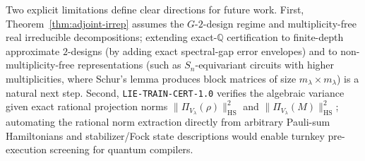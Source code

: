 \documentclass[11pt,a4paper]{article}
\theoremstyle{definition}
\theoremstyle{remark}
\newcommand{\QQ}{\mathbb{Q}}
\newcommand{\HS}{\mathrm{HS}}
\newcommand{\certschema}{\texttt{LIE-TRAIN-CERT-1.0}}
\begin{document}
Two explicit limitations define clear directions for future work. First, Theorem~\ref{thm:adjoint-irrep} assumes the $G$-$2$-design regime and multiplicity-free real irreducible decompositions; extending exact-$\QQ$ certification to finite-depth approximate $2$-designs (by adding exact spectral-gap error envelopes) and to non-multiplicity-free representations (such as $S_n$-equivariant circuits with higher multiplicities, where Schur's lemma produces block matrices of size $m_\lambda \times m_\lambda$) is a natural next step. Second, \certschema{} verifies the algebraic variance given exact rational projection norms $\|\Pi_{V_\lambda}(\rho)\|_{\HS}^2$ and $\|\Pi_{V_\lambda}(M)\|_{\HS}^2$; automating the rational norm extraction directly from arbitrary Pauli-sum Hamiltonians and stabilizer/Fock state descriptions would enable turnkey pre-execution screening for quantum compilers.



\end{document}
